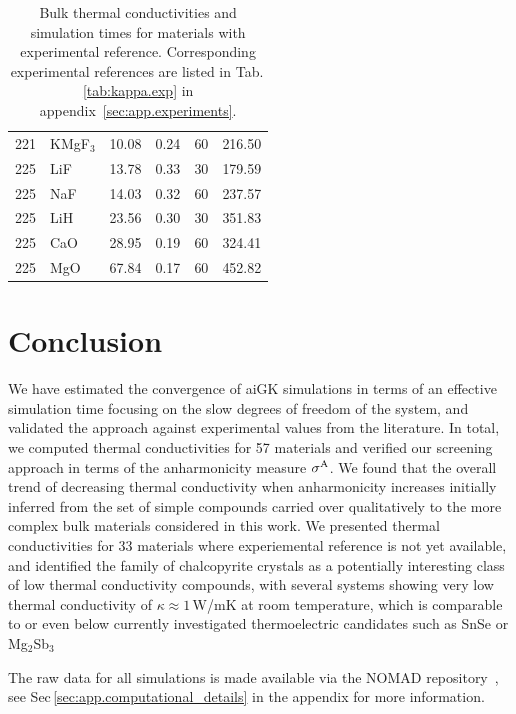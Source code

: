 \begin{table}[ht]
\begin{tabularx}{\linewidth}{rXXXrr}
         221 &     KMgF$_3$ &            10.08 &       0.24 &         60 &     216.50 \\
         225 &          LiF &            13.78 &       0.33 &         30 &     179.59 \\
         225 &          NaF &            14.03 &       0.32 &         60 &     237.57 \\
         225 &          LiH &            23.56 &       0.30 &         30 &     351.83 \\
         225 &          CaO &            28.95 &       0.19 &         60 &     324.41 \\
         225 &          MgO &            67.84 &       0.17 &         60 &     452.82 \\
\bottomrule
\end{tabularx}
  \caption{Bulk thermal conductivities and simulation times for materials with experimental reference. Corresponding experimental references are listed in Tab.\,\ref{tab:kappa.exp} in appendix~\ref{sec:app.experiments}.}
  \label{tab:kappa.w/exp}
\end{table}

\section{Conclusion}
We have estimated the convergence of aiGK simulations in terms of an effective simulation time focusing on the slow degrees of freedom of the system, and validated the approach against experimental values from the literature. In total, we computed thermal conductivities for 57 materials and verified our screening approach in terms of the anharmonicity measure $\sigma^\mathrm{A}$. We found that the overall trend of decreasing thermal conductivity when anharmonicity increases initially inferred from the set of simple compounds carried over qualitatively to the more complex bulk materials considered in this work. We presented thermal conductivities for 33 materials where experiemental reference is not yet available, and identified the family of chalcopyrite crystals as a potentially interesting class of low thermal conductivity compounds, with several systems showing very low thermal conductivity of $\kappa \approx 1$\,W/mK at room temperature, which is comparable to or even below currently investigated thermoelectric candidates such as SnSe or Mg$_2$Sb$_3$~\cite{Zhao.2014,Wei.2016,Sassi.2014,Pan.2020,kajikawa2003,Condron.2006,Zhang.2009,Zhang.2018,Ding.2021}

The raw data for all simulations is made available via the NOMAD repository~\cite{Draxl.2019}, see Sec\,\ref{sec:app.computational_details} in the appendix for more information.



